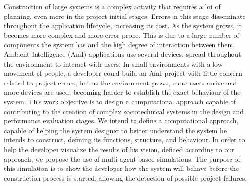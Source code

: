 Construction of large systems is a complex activity that requires a lot of planning, even more in the project initial stages. Errors in this stage disseminate throughout the application lifecycle, increasing its cost. As the system grows, it becomes more complex and more error-prone. This is due to a large number of components the system has and the high degree of interaction between them.
Ambient Intelligence (AmI) applications use several devices, spread throughout the environment to interact with users. In small environments with a low movement of people, a developer could build an AmI project with little concern related to project errors, but as the environment grows, more users arrive and more devices are used, becoming harder to establish the exact behaviour of the system.
This work objective is to design a computational approach capable of contributing to the creation of complex sociotechnical systems in the design and performance evaluation stages. We intend to define a computational approach, capable of helping the system designer to better understand the system he intends to construct, defining its functions, structure, and behaviour.
In order to help the developer visualize the results of his vision, defined according to our approach, we propose the use of multi-agent based simulations. The purpose of this simulation is to show the developer how the system will behave before the construction process is started, allowing the detection of possible project failures.

